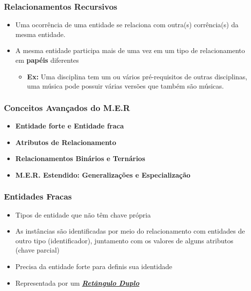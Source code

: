 \documentclass[12pt,a4paper,titlepage]{article}
\begin{document}
\subsubsection{Relacionamentos Recursivos}
\begin{itemize}
    \item
        Uma ocorrência de uma entidade se relaciona com outra(s) corrência(s) da mesma entidade.
    \item 
        A mesma entidade participa mais de uma vez em um tipo de relacionamento em \textbf{papéis} diferentes
        \begin{itemize}
            \item
                \textbf{Ex:} Uma disciplina tem um ou vários pré-requisitos de outras disciplinas, uma música pode possuir várias versões que também são músicas.
        \end{itemize}
\end{itemize}

\subsubsection{Conceitos Avançados do M.E.R}
\begin{itemize}
    \item \textbf{Entidade forte e Entidade fraca}
    \item \textbf{Atributos de Relacionamento}
    \item \textbf{Relacionamentos Binários e Ternários}
    \item \textbf{M.E.R. Estendido: Generalizações e Especialização}
\end{itemize}

\subsubsection{Entidades Fracas}
\begin{itemize}
    \item Tipos de entidade que não têm chave própria
    \item As instâncias são identificadas por meio do relacionamento com entidades de outro tipo (identificador), juntamento com os valores de alguns atributos (chave parcial)
    \item Precisa da entidade forte para definis sua identidade
    \item Representada por um \textbf{\textit{\underline{Retângulo Duplo}}}
\end{itemize}
\end{document}
